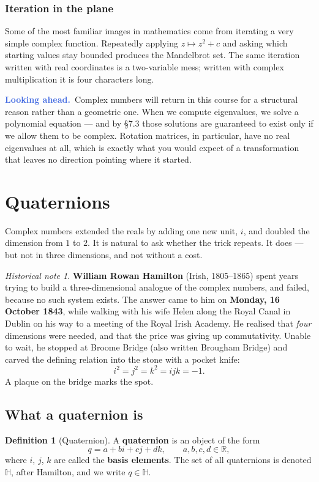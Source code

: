 \documentclass[11pt]{article}
\theoremstyle{definition}
\newtheorem{defn}{Definition}
\theoremstyle{remark}
\newtheorem*{hist}{Historical note}
\newcommand{\lookahead}{\par\smallskip\noindent
  \textbf{\sffamily\textcolor{RoyalBlue}{Looking ahead.}}\ \ignorespaces}
\newcommand{\R}{\mathbb{R}}
\newcommand{\Hq}{\mathbb{H}}
\begin{document}
\subsubsection*{Iteration in the plane}
Some of the most familiar images in mathematics come from iterating a very
simple complex function. Repeatedly applying $z\mapsto z^{2}+c$ and asking which
starting values stay bounded produces the Mandelbrot set. The same iteration
written with real coordinates is a two-variable mess; written with complex
multiplication it is four characters long.

\lookahead Complex numbers will return in this course for a structural reason
rather than a geometric one. When we compute eigenvalues, we solve a polynomial
equation --- and by \S7.3 those solutions are guaranteed to exist only if we
allow them to be complex. Rotation matrices, in particular, have no real
eigenvalues at all, which is exactly what you would expect of a transformation
that leaves no direction pointing where it started.

\section{Quaternions}
Complex numbers extended the reals by adding one new unit, $i$, and doubled the
dimension from $1$ to $2$. It is natural to ask whether the trick repeats. It
does --- but not in three dimensions, and not without a cost.

\begin{hist}
\textbf{William Rowan Hamilton} (Irish, 1805--1865) spent years trying to build
a three-dimensional analogue of the complex numbers, and failed, because no such
system exists. The answer came to him on \textbf{Monday, 16 October 1843}, while
walking with his wife Helen along the Royal Canal in Dublin on his way to a
meeting of the Royal Irish Academy. He realised that \emph{four} dimensions were
needed, and that the price was giving up commutativity. Unable to wait, he
stopped at Broome Bridge (also written Brougham Bridge) and carved the defining
relation into the stone with a pocket knife:
\[
  i^{2}=j^{2}=k^{2}=ijk=-1 .
\]
A plaque on the bridge marks the spot.
\end{hist}

\subsection{What a quaternion is}
\begin{defn}[Quaternion]
A \textbf{quaternion} is an object of the form
\[
  q = a + bi + cj + dk ,
  \qquad a,b,c,d\in\R ,
\]
where $i$, $j$, $k$ are called the \textbf{basis elements}. The set of all
quaternions is denoted $\Hq$, after Hamilton, and we write $q\in\Hq$.
\end{defn}
\end{document}
